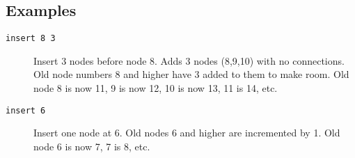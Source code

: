 \subsection{Examples}

\begin{description}

\item[{\tt insert 8 3}] Insert 3 nodes before node 8.  Adds 3 nodes (8,9,10)
with no connections.  Old node numbers 8 and higher have 3 added to them to
make room.  Old node 8 is now 11, 9 is now 12, 10 is now 13, 11 is 14, etc.

\item[{\tt insert 6}] Insert one node at 6.  Old nodes 6 and higher are
incremented by 1.  Old node 6 is now 7, 7 is 8, etc.

\end{description}
